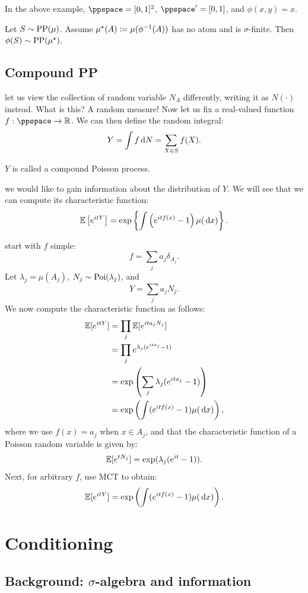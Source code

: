 \documentclass{article}
\begin{document}
 In the above example, $\ppspace = [0,1]^2$, $\ppspace' = [0,1]$, and $\phi(x, y) = x$.

 Let $S \sim \operatorname{PP}(\mu)$. Assume $\mu^\star(A) \coloneqq \mu(\phi^{-1}(A))$ has no atom and is $\sigma$-finite. Then $\phi(S) \sim \operatorname{PP}(\mu^\star)$.


\subsection{Compound PP}

 let us view the collection of random variable $N_A$ differently, writing it as $N(\cdot)$ instead. What is this? A random measure! Now let us fix a real-valued function $f : \ppspace \to \R$. We can then define the random integral:
\[ Y = \int f \,\mathrm{d} N = \sum_{X \in S} f(X). \]

 $Y$ is called a compound Poisson process.

 we would like to gain information about the distribution of $Y$. We will see that we can compute its characteristic function:
\[ {\mathbb E}\left[e^{itY}\right] = \exp\left\{ \int \left(e^{itf(x)} - 1\right) \mu(\,\mathrm{d} x) \right\}. \]

 start with $f$ simple:
\[ f = \sum_j a_j \delta_{A_j}. \]
Let $\lambda_j = \mu(A_j)$, $N_j \sim \operatorname{Poi}(\lambda_j)$, and
\[ Y = \sum_j a_j N_j. \]
We now compute the characteristic function as follows:
\begin{align*}
{\mathbb E}[ e^{itY} ] &= \prod_j {\mathbb E}[e^{ita_j N_j}] \\
&= \prod_j e^{\lambda_j (e^{ita_j} - 1)} \\
&= \exp\left( \sum_j \lambda_j (e^{it a_j} - 1)\right) \\
&= \exp\left( \int (e^{itf(x)} - 1)\mu(\,\mathrm{d} x)\right),
\end{align*}
where we use $f(x) = a_j$ when $x \in A_j$, and that the characteristic function of a Poisson 
random variable is given by:
\[ {\mathbb E}[e^{t N_j}] = \exp(\lambda_j (e^{it} - 1)).\]
Next, for arbitrary $f$, use MCT to obtain:
\[ {\mathbb E}[ e^{itY} ] = \exp\left( \int (e^{itf(x)} - 1)		 \mu(\,\mathrm{d} x)\right). \]


\section{Conditioning}

\subsection{Background: $\sigma$-algebra and information}\label{sec:sigma-algebra-and-information}
\end{document}
